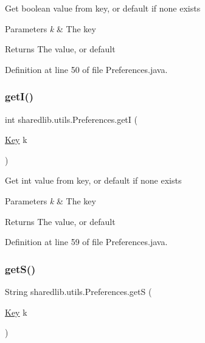 Get boolean value from key, or default if none exists 
\begin{DoxyParams}{Parameters}
{\em k} & The key \\
\hline
\end{DoxyParams}
\begin{DoxyReturn}{Returns}
The value, or default 
\end{DoxyReturn}


Definition at line 50 of file Preferences.\+java.

\hypertarget{classsharedlib_1_1utils_1_1_preferences_a28f7df716af43382a4380735617c5575}{}\label{classsharedlib_1_1utils_1_1_preferences_a28f7df716af43382a4380735617c5575} 
\subsubsection{\texorpdfstring{get\+I()}{getI()}}
{\footnotesize\ttfamily int sharedlib.\+utils.\+Preferences.\+getI (\begin{DoxyParamCaption}\item[{\hyperlink{interfacesharedlib_1_1utils_1_1_preferences_1_1_key}{Key}}]{k }\end{DoxyParamCaption})}

Get int value from key, or default if none exists 
\begin{DoxyParams}{Parameters}
{\em k} & The key \\
\hline
\end{DoxyParams}
\begin{DoxyReturn}{Returns}
The value, or default 
\end{DoxyReturn}


Definition at line 59 of file Preferences.\+java.

\hypertarget{classsharedlib_1_1utils_1_1_preferences_ab04e20950816d085a9b8c07eed5edc73}{}\label{classsharedlib_1_1utils_1_1_preferences_ab04e20950816d085a9b8c07eed5edc73} 
\subsubsection{\texorpdfstring{get\+S()}{getS()}}
{\footnotesize\ttfamily String sharedlib.\+utils.\+Preferences.\+getS (\begin{DoxyParamCaption}\item[{\hyperlink{interfacesharedlib_1_1utils_1_1_preferences_1_1_key}{Key}}]{k }\end{DoxyParamCaption})}

